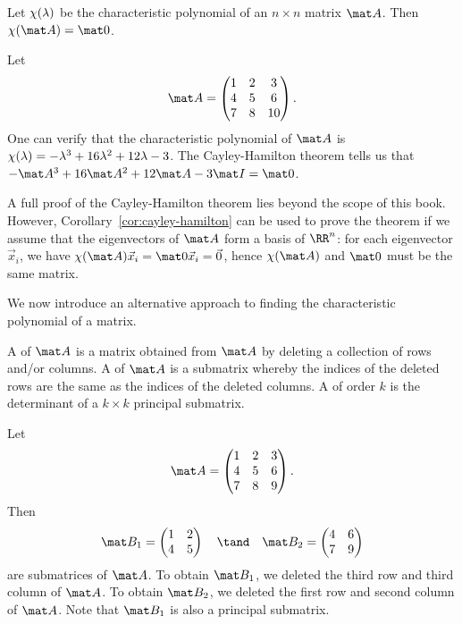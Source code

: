 \begin{theorem}
    Let $\chi(\lambda)$ be the characteristic polynomial of an $n \times n$ matrix $\mat A$. Then $\c(\mat A) = \mat 0$.
\end{theorem}

\begin{example}
    Let \[\mat A = \begin{pmatrix}1 & 2 & 3 \\ 4 & 5 & 6 \\ 7 & 8 & 10\end{pmatrix}.\] One can verify that the characteristic polynomial of $\mat A$ is $\chi(\lambda) = -\lambda^3 + 16 \lambda^2 + 12 \lambda - 3$. The Cayley-Hamilton theorem tells us that $-\mat A^3 + 16 \mat A^2 + 12 \mat A - 3 \mat I = \mat 0$.
\end{example}

A full proof of the Cayley-Hamilton theorem lies beyond the scope of this book. However, Corollary~\ref{cor:cayley-hamilton} can be used to prove the theorem if we assume that the eigenvectors of $\mat A$ form a basis of $\RR^n$: for each eigenvector $\vec x_i$, we have $\c(\mat A) \vec x_i = \mat 0 \vec x_i = \vec 0$, hence $\c(\mat A)$ and $\mat 0$ must be the same matrix.

We now introduce an alternative approach to finding the characteristic polynomial of a matrix.

\begin{definition}
    A  of $\mat A$ is a matrix obtained from $\mat A$ by deleting a collection of rows and/or columns. A  of $\mat A$ is a submatrix whereby the indices of the deleted rows are the same as the indices of the deleted columns. A  of order $k$ is the determinant of a $k \times k$ principal submatrix.
\end{definition}

\begin{example}[Submatrices]
    Let \[\mat A = \begin{pmatrix}1 & 2 & 3 \\ 4 & 5 & 6 \\ 7 & 8 & 9\end{pmatrix}.\] Then \[\mat B_1 = \begin{pmatrix}1 & 2 \\ 4 & 5\end{pmatrix} \quad \tand \quad \mat B_2 = \begin{pmatrix}4 & 6 \\ 7 & 9\end{pmatrix}\] are submatrices of $\mat A$. To obtain $\mat B_1$, we deleted the third row and third column of $\mat A$. To obtain $\mat B_2$, we deleted the first row and second column of $\mat A$. Note that $\mat B_1$ is also a principal submatrix.
\end{example}

